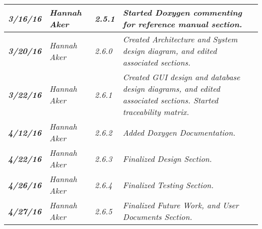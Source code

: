 \begin{tabular}{|>{\raggedright}p{1.5cm}|>{\raggedright}p{3cm}|>{\raggedright}p{1.5cm}|>{\raggedright}p{9cm}|}
\hline
 \textit{\textbf{3/16/16}} & \textit{Hannah Aker} & \textit{2.5.1} & \textit{Started Doxygen commenting for reference manual section.}\tabularnewline
\hline
 \textit{\textbf{3/20/16}} & \textit{Hannah Aker} & \textit{2.6.0} & \textit{Created Architecture and System design diagram, and edited associated sections.}\tabularnewline
\hline
 \textit{\textbf{3/22/16}} & \textit{Hannah Aker} & \textit{2.6.1} & \textit{Created GUI design and database design diagrams, and edited associated sections. Started traceability matrix.}\tabularnewline
\hline
 \textit{\textbf{4/12/16}} & \textit{Hannah Aker} & \textit{2.6.2} & \textit{Added Doxygen Documentation.}\tabularnewline
\hline
 \textit{\textbf{4/22/16}} & \textit{Hannah Aker} & \textit{2.6.3} & \textit{Finalized Design Section.}\tabularnewline
\hline
 \textit{\textbf{4/26/16}} & \textit{Hannah Aker} & \textit{2.6.4} & \textit{Finalized Testing Section.}\tabularnewline
\hline
 \textit{\textbf{4/27/16}} & \textit{Hannah Aker} & \textit{2.6.5} & \textit{Finalized Future Work, and User Documents Section.}\tabularnewline
\hline
\end{tabular}
\vfill


